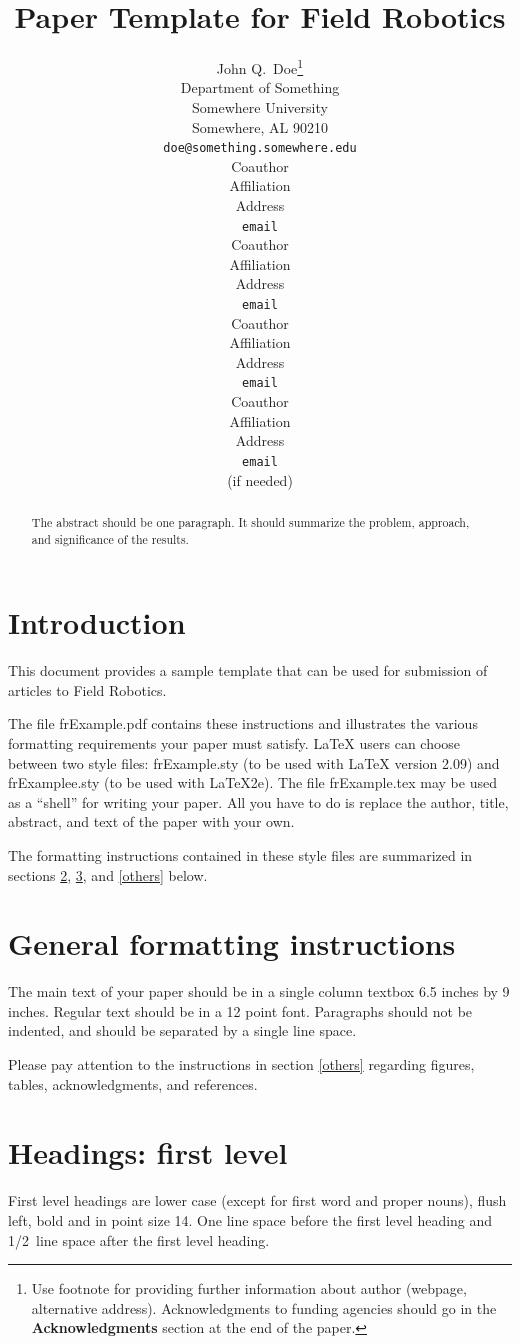 \documentclass{article}
\title{Paper Template for Field Robotics}
\author{
John Q.~Doe\thanks{ Use footnote for providing further information
about author (webpage, alternative address). Acknowledgments to
funding agencies should go in the \textbf{Acknowledgments} section
at the end of the paper.} \\
Department of Something\\
Somewhere University\\
Somewhere, AL 90210 \\
\texttt{doe@something.somewhere.edu} \\
\And
Coauthor \\
Affiliation \\
Address \\
\texttt{email} \\
\AND
Coauthor \\
Affiliation \\
Address \\
\texttt{email} \\
\And
Coauthor \\
Affiliation \\
Address \\
\texttt{email} \\
\And
Coauthor \\
Affiliation \\
Address \\
\texttt{email} \\
(if needed)\\
}
\begin{document}
\maketitle

\begin{abstract}
The abstract should be one paragraph. It should summarize the
problem, approach, and significance of the results.
\end{abstract}

\section{Introduction}

This document provides a sample template that can be used for
submission of articles to Field Robotics.


The file frExample.pdf contains these
instructions and illustrates the various formatting requirements
your paper must satisfy. \LaTeX{} users can choose between two
style files: frExample.sty (to be used with \LaTeX{} version 2.09)
and frExamplee.sty (to be used with \LaTeX{}2e). The file
frExample.tex may be used as a ``shell'' for writing your paper.
All you have to do is replace the author, title, abstract, and text
of the paper with your own.

The formatting instructions contained in these style files are summarized in
sections \ref{gen_inst}, \ref{headings}, and \ref{others} below.

\section{General formatting instructions}
\label{gen_inst}

The main text of your paper should be in a single column textbox 6.5
inches by 9 inches. Regular text should be in a 12 point font.
Paragraphs should not be indented, and should be separated by a
single line space.

Please pay attention to the instructions in section \ref{others}
regarding figures, tables, acknowledgments, and references.

\section{Headings: first level}
\label{headings}

First level headings are lower case (except for first word and
proper nouns), flush left, bold and in point size 14. One line space
before the first level heading and 1/2~line space after the first
level heading.
\end{document}

